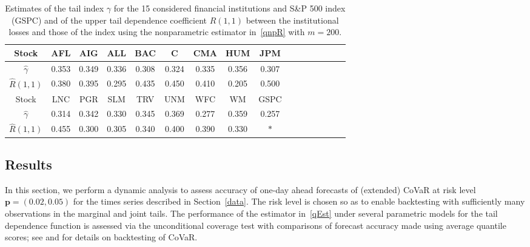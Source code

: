 \documentclass[11pt,letterpaper]{article}
\def\pb{{\mathbf p}}
\numberwithin{equation}{section}
\begin{document}
\begin{table}[H]
\footnotesize
\centering
\caption{Estimates of the tail index $\gamma$ for the 15 considered financial institutions and S\&P 500 index (GSPC) and of the upper tail dependence coefficient $R(1,1)$ between the institutional losses and those of the index using the nonparametric estimator in~\eqref{qnpR} with $m=200$.}
\vspace{24pt}
\begin{tabular}{c|ccccc c c c c c  c c c c c }
\hline\hline
Stock               & AFL           & AIG           & ALL           & BAC           & C       & CMA           & HUM           & JPM     \\ \hline\hline
$\hat{\gamma}$      & 0.353         & 0.349         & 0.336         & 0.308         & 0.324     & 0.335         & 0.356         & 0.307             \\
$\hat{R}(1,1)$ & 0.380 & 0.395 & 0.295 & 0.435 & 0.450 & 0.410 & 0.205  & 0.500 \\
\hline\hline
Stock        & LNC           & PGR       & SLM           & TRV           & UNM           & WFC           & WM & GSPC \\\hline\hline
$\hat{\gamma}$ & 0.314         & 0.342     & 0.330         & 0.345         & 0.369         & 0.277         & 0.359  & 0.257 \\
$\hat{R}(1,1)$  & 0.455 & 0.300 & 0.305  & 0.340  & 0.400  & 0.390 & 0.330 & $\ast$ \\
\end{tabular}
\label{tab3}
\end{table}


\subsection{Results}
\label{dynamic}
In this section, we perform a dynamic analysis to assess accuracy of one-day ahead forecasts of (extended) CoVaR at risk level $\pb = (0.02,0.05)$ for the times series described in Section~\ref{data}. The risk level is chosen so as to enable backtesting with sufficiently many observations in the marginal and joint tails. The performance of the estimator in~\eqref{qEst} under several parametric models for the tail dependence function is assessed via the unconditional coverage test with comparisons of forecast accuracy made using average quantile scores; see \cite{Banulescu_etal2020} and \cite{FisslerHoga2021} for details on backtesting of CoVaR. 
\end{document}
